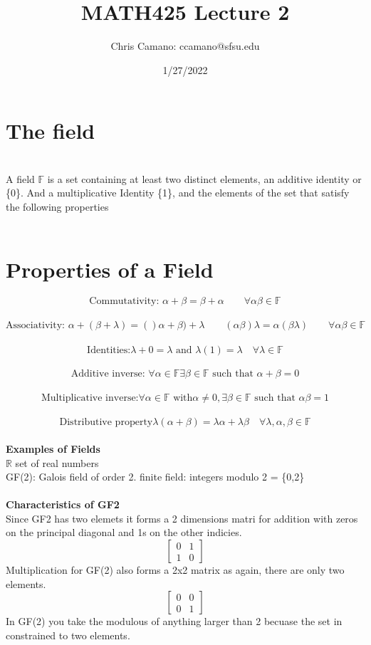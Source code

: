 \documentclass[12pt,a4paper]{article}
\author{Chris Camano: ccamano@sfsu.edu}
\title{MATH425 Lecture 2}
\date{1/27/2022}
\begin{document}
\maketitle
\section{The field}\\
A field $\mathbb{F}$ is a set containing at least two distinct elements, an additive identity or \{0\}. And a multiplicative Identity \{1\}, and the elements of the set that satisfy the following properties \\\\
\section{Properties of a Field}
$$
  \text{Commutativity:  } \alpha + \beta = \beta + \alpha\qquad  \forall \alpha\beta \in \mathbb{F} $$
  \\
  $$\text{Associativity:  } \alpha + (\beta+\lambda) = ()\alpha + \beta)+\lambda\qquad (\alpha\beta)\lambda=\alpha(\beta\lambda)\qquad \forall \alpha\beta \in \mathbb{F} $$
  \\
  $$\text{Identities:} \lambda + 0 = \lambda \text{ and } \lambda(1)=\lambda \quad \forall \lambda \in \mathbb{F}$$
  \\
  $$\text{Additive inverse: } \forall \alpha \in \mathbb{F} \exists \beta \in \mathbb{F} \text{ such that } \alpha + \beta=0$$
  \\
  $$\text{Multiplicative inverse:} \forall \alpha \in \mathbb{F} \text{ with} \alpha \neq 0,\exists \beta \in \mathbb{F} \text{ such that } \alpha\beta=1$$
  \\
  $$\text{Distributive property} \lambda(\alpha+\beta)=\lambda\alpha +\lambda\beta \quad \forall \lambda,\alpha,\beta \in \mathbb{F}
$$
\\
\textbf{Examples of Fields}\\
$\mathbb{R}$ set of real numbers\\
GF(2): Galois field of order 2. finite field: integers modulo 2 = \{0,2\}
\\\\
\textbf{Characteristics of GF2}\\
Since GF2 has two elemets it forms a 2 dimensions matri for addition with zeros on the principal diagonal and 1s on the other indicies.\\
\[
 \begin{bmatrix}
0 & 1 \\
1 & 0
\end{bmatrix}
\]
Multiplication for GF(2) also forms a 2x2 matrix as again, there are only two elements.
$$ \begin{bmatrix}
0 & 0 \\
0 & 1
\end{bmatrix}  $$
In GF(2) you take the modulous of anything larger than 2 becuase the set in constrained to two elements. \\
\end{document}
